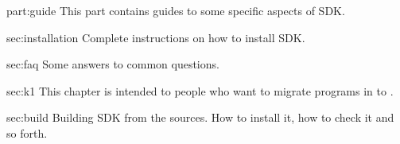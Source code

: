 \begin{partDescription}{part:guide}
  {
    This part contains guides to some specific aspects of \urbi SDK.
  }
\item[sec:installation]
  Complete instructions on how to install \urbi SDK.
\item[sec:faq]
  Some answers to common questions.
\item[sec:k1] This chapter is intended to people who want to migrate
  programs in  to .
\item[sec:build] Building \urbi SDK from the sources.  How to install it,
  how to check it and so forth.
\end{partDescription}

